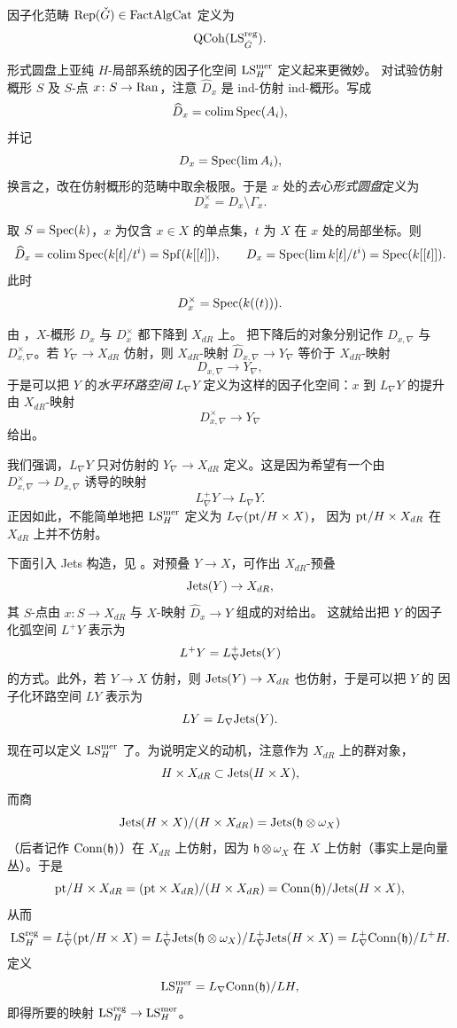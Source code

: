 \begin{definition}
\label{def:rep}
因子化范畴 $\mathrm{Rep}(\check G)\in \mathrm{FactAlgCat}$ 定义为
\[
\mathrm{QCoh}(\mathrm{LS}^{\mathrm{reg}}_{\check G}).
\]
\end{definition}

形式圆盘上亚纯 $H$-局部系统的因子化空间 $\mathrm{LS}^{\mathrm{mer}}_H$ 定义起来更微妙。
对试验仿射概形 $S$ 及 $S$-点 $x\colon S\to \mathrm{Ran}$，注意 $\widehat{D}_x$ 是 ind-仿射
ind-概形。写成
\[
\widehat{D}_x=\operatorname*{colim} \operatorname{Spec}(A_i),
\]
并记
\[
D_x=\operatorname{Spec}(\lim A_i),
\]
换言之，改在仿射概形的范畴中取余极限。于是 $x$ 处的\emph{去心形式圆盘}定义为
\[
D^\times_x=D_x\setminus \Gamma_x .
\]

\begin{example}
\label{ex:formal-disk}
取 $S=\operatorname{Spec}(k)$，$x$ 为仅含 $x\in X$ 的单点集，$t$ 为 $X$ 在 $x$ 处的局部坐标。则
\[
\widehat{D}_x=\operatorname*{colim} \operatorname{Spec}(k[t]/t^i)=\operatorname{Spf}(k[[t]]), \qquad
D_x=\operatorname{Spec}(\lim k[t]/t^i)=\operatorname{Spec}(k[[t]]).
\]
此时
\[
D^\times_x=\operatorname{Spec}(k((t))).
\]
\end{example}

由 \cite[附录 A.1]{Bog24}，$X$-概形 $D_x$ 与 $D^\times_x$ 都下降到 $X_{dR}$ 上。
把下降后的对象分别记作 $D_{x,\nabla}$ 与 $D^\times_{x,\nabla}$。若 $Y_\nabla\to X_{dR}$
仿射，则 $X_{dR}$-映射 $\widehat{D}_{x,\nabla}\to Y_\nabla$ 等价于 $X_{dR}$-映射
\[
D_{x,\nabla}\to Y_\nabla,
\]
于是可以把 $Y$ 的\emph{水平环路空间} $L_\nabla Y$ 定义为这样的因子化空间：$x$ 到
$L_\nabla Y$ 的提升由 $X_{dR}$-映射
\[
D^\times_{x,\nabla}\to Y_\nabla
\]
给出。

\begin{remark}
\label{rem:loop-space-affine}
我们强调，$L_\nabla Y$ 只对仿射的 $Y_\nabla\to X_{dR}$ 定义。这是因为希望有一个由
$D^\times_{x,\nabla}\to D_{x,\nabla}$ 诱导的映射
\[
L^+_\nabla Y\to L_\nabla Y .
\]
正因如此，不能简单地把 $\mathrm{LS}^{\mathrm{mer}}_H$ 定义为 $L_\nabla(\mathrm{pt}/H\times X)$，
因为 $\mathrm{pt}/H\times X_{dR}$ 在 $X_{dR}$ 上并不仿射。
\end{remark}

下面引入 Jets 构造，见 \cite[附录 B.5]{ABC+24a}。对预叠 $Y\to X$，可作出 $X_{dR}$-预叠
\[
\mathrm{Jets}(Y)\to X_{dR},
\]
其 $S$-点由 $x\colon S\to X_{dR}$ 与 $X$-映射 $\widehat{D}_x\to Y$ 组成的对给出。
这就给出把 $Y$ 的因子化弧空间 $L^+Y$ 表示为
\[
L^+Y=L^+_\nabla\mathrm{Jets}(Y)
\]
的方式。此外，若 $Y\to X$ 仿射，则 $\mathrm{Jets}(Y)\to X_{dR}$ 也仿射，于是可以把 $Y$ 的
因子化环路空间 $LY$ 表示为
\[
LY=L_\nabla \mathrm{Jets}(Y).
\]

现在可以定义 $\mathrm{LS}^{\mathrm{mer}}_H$ 了。为说明定义的动机，注意作为 $X_{dR}$ 上的群对象，
\[
H\times X_{dR}\subset \mathrm{Jets}(H\times X),
\]
而商
\[
\mathrm{Jets}(H\times X)/(H\times X_{dR})=\mathrm{Jets}(\mathfrak{h}\otimes \omega_X)
\]
（后者记作 $\mathrm{Conn}(\mathfrak{h})$）在 $X_{dR}$ 上仿射，因为 $\mathfrak{h}\otimes\omega_X$ 在
$X$ 上仿射（事实上是向量丛）。于是
\[
\mathrm{pt}/H\times X_{dR}=(\mathrm{pt}\times X_{dR})/(H\times X_{dR})
=\mathrm{Conn}(\mathfrak{h})/\mathrm{Jets}(H\times X),
\]
从而
\[
\mathrm{LS}^{\mathrm{reg}}_H=L^+_\nabla(\mathrm{pt}/H\times X)
=L^+_\nabla\mathrm{Jets}(\mathfrak{h}\otimes\omega_X)/L^+_\nabla\mathrm{Jets}(H\times X)
=L^+_\nabla\mathrm{Conn}(\mathfrak{h})/L^+H .
\]
定义
\[
\mathrm{LS}^{\mathrm{mer}}_H=L_\nabla\mathrm{Conn}(\mathfrak{h})/LH,
\]
即得所要的映射 $\mathrm{LS}^{\mathrm{reg}}_H\to \mathrm{LS}^{\mathrm{mer}}_H$。

